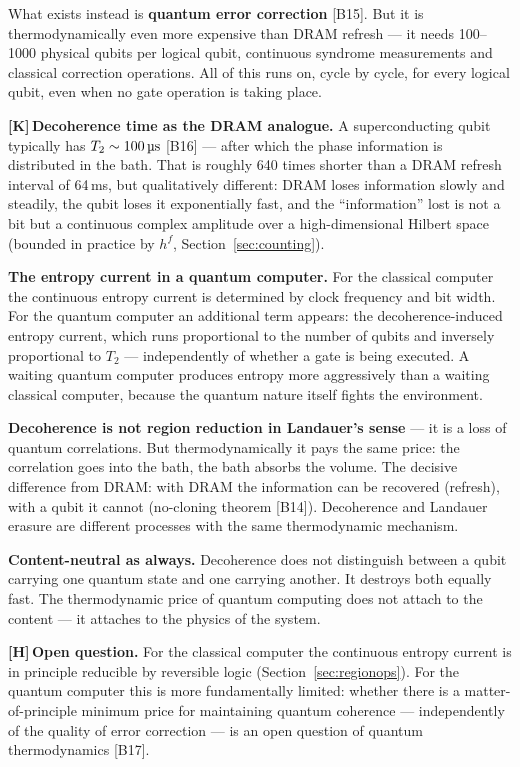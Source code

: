 \documentclass[11pt,a4paper]{article}
\newcommand{\LK}{\textcolor{layK}{\textbf{\footnotesize\textsf{[K]}}}\,}
\newcommand{\LH}{\textcolor{layH}{\textbf{\footnotesize\textsf{[H]}}}\,}
\begin{document}
What exists instead is \textbf{quantum error correction} [B15]. But it is
thermodynamically even more expensive than DRAM refresh --- it needs 100--1000
physical qubits per logical qubit, continuous syndrome measurements and classical
correction operations. All of this runs on, cycle by cycle, for every logical
qubit, even when no gate operation is taking place.

\LK \textbf{Decoherence time as the DRAM analogue.} A superconducting qubit
typically has $T_2 \sim 100\,\text{\textmu s}$ [B16] --- after which the phase
information is distributed in the bath. That is roughly 640 times shorter than a
DRAM refresh interval of 64\,ms, but qualitatively different: DRAM loses
information slowly and steadily, the qubit loses it exponentially fast, and the
“information” lost is not a bit but a continuous complex amplitude over a
high-dimensional Hilbert space (bounded in practice by $h^f$,
Section~\ref{sec:counting}).

\textbf{The entropy current in a quantum computer.} For the classical computer the
continuous entropy current is determined by clock frequency and bit width. For the
quantum computer an additional term appears: the decoherence-induced entropy
current, which runs proportional to the number of qubits and inversely
proportional to $T_2$ --- independently of whether a gate is being executed. A
waiting quantum computer produces entropy more aggressively than a waiting
classical computer, because the quantum nature itself fights the environment.

\textbf{Decoherence is not region reduction in Landauer's sense} --- it is a loss
of quantum correlations. But thermodynamically it pays the same price: the
correlation goes into the bath, the bath absorbs the volume. The decisive
difference from DRAM: with DRAM the information can be recovered (refresh), with a
qubit it cannot (no-cloning theorem [B14]). Decoherence and Landauer erasure are
different processes with the same thermodynamic mechanism.

\textbf{Content-neutral as always.} Decoherence does not distinguish between a
qubit carrying one quantum state and one carrying another. It destroys both
equally fast. The thermodynamic price of quantum computing does not attach to the
content --- it attaches to the physics of the system.

\LH \textbf{Open question.} For the classical computer the continuous entropy
current is in principle reducible by reversible logic
(Section~\ref{sec:regionops}). For the quantum computer this is more
fundamentally limited: whether there is a matter-of-principle minimum price for
maintaining quantum coherence --- independently of the quality of error correction
--- is an open question of quantum thermodynamics [B17].
\end{document}
